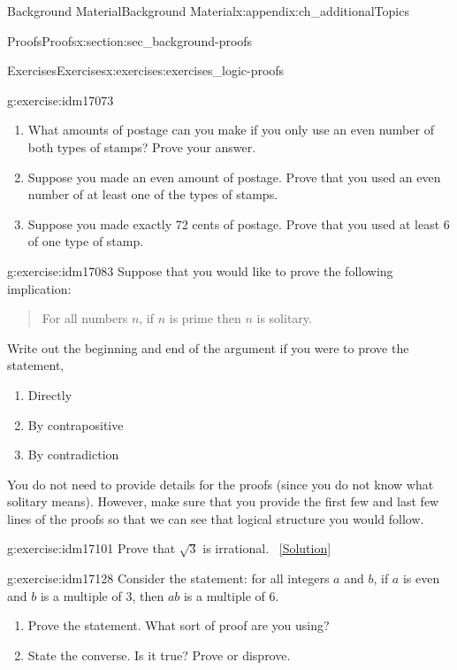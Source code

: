 \documentclass[oneside,10pt,]{book}
\numberwithin{equation}{chapter}
\begin{document}
\begin{appendixptx}{Background Material}{}{Background Material}{}{}{x:appendix:ch_additionalTopics}
\begin{sectionptx}{Proofs}{}{Proofs}{}{}{x:section:sec_background-proofs}
\begin{exercises-subsection}{Exercises}{}{Exercises}{}{}{x:exercises:exercises_logic-proofs}
\begin{divisionexercise}{4}{}{}{g:exercise:idm17073}
\begin{enumerate}[label=(\alph*)]
\item{}What amounts of postage can you make if you only use an even number of both types of stamps? Prove your answer.%
\item{}Suppose you made an even amount of postage. Prove that you used an even number of at least one of the types of stamps.%
\item{}Suppose you made exactly 72 cents of postage. Prove that you used at least 6 of one type of stamp.%
\end{enumerate}
%
\end{divisionexercise}%
\begin{divisionexercise}{5}{}{}{g:exercise:idm17083}%
Suppose that you would like to prove the following implication:%
\begin{quote}%
For all numbers \(n\), if \(n\) is prime then \(n\) is solitary.%
\end{quote}
Write out the beginning and end of the argument if you were to prove the statement,%
\par
%
\begin{enumerate}[label=(\alph*)]
\item{}Directly %
\item{}By contrapositive %
\item{}By contradiction %
\end{enumerate}
%
\par
You do not need to provide details for the proofs (since you do not know what solitary means). However, make sure that you provide the first few and last few lines of the proofs so that we can see that logical structure you would follow.%
\end{divisionexercise}%
\begin{divisionexercise}{6}{}{}{g:exercise:idm17101}%
Prove that \(\sqrt 3\) is irrational.%
\qquad~\hfill{\tiny\hyperlink{g:solution:idm17105-main}{[Solution]}}\end{divisionexercise}%
\begin{divisionexercise}{7}{}{}{g:exercise:idm17128}%
Consider the statement: for all integers \(a\) and \(b\), if \(a\) is even and \(b\) is a multiple of 3, then \(ab\) is a multiple of 6.%
\par
%
\begin{enumerate}[label=(\alph*)]
\item{}Prove the statement. What sort of proof are you using?%
\item{}State the converse. Is it true? Prove or disprove.%
\end{enumerate}

\end{divisionexercise}
\end{exercises-subsection}
\end{sectionptx}
\end{appendixptx}
\end{document}
